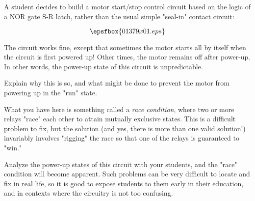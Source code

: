 

A student decides to build a motor start/stop control circuit based on the logic of a NOR gate S-R latch, rather than the usual simple "seal-in" contact circuit:

$$\epsfbox{01379x01.eps}$$

The circuit works fine, except that sometimes the motor starts all by itself when the circuit is first powered up!  Other times, the motor remains off after power-up.  In other words, the power-up state of this circuit is unpredictable.

Explain why this is so, and what might be done to prevent the motor from powering up in the "run" state.







What you have here is something called a {\it race condition}, where two or more relays "race" each other to attain mutually exclusive states.  This is a difficult problem to fix, but the solution (and yes, there is more than one valid solution!) invariably involves "rigging" the race so that one of the relays is guaranteed to "win."







Analyze the power-up states of this circuit with your students, and the "race" condition will become apparent.  Such problems can be very difficult to locate and fix in real life, so it is good to expose students to them early in their education, and in contexts where the circuitry is not too confusing.  



